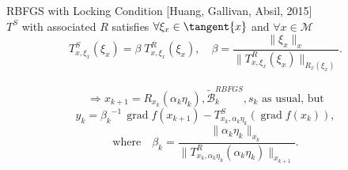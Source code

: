 \documentclass[9.4pt]{beamer}
\begin{document}
\begin{frame}{RBFGS with Locking Condition}
    \vspace{-1\baselineskip}\hfill{\tiny{[Huang, Gallivan, Absil, 2015]}} \\
    $T^S$ with associated $R$ satisfies $\forall \xi_x \in \tangent{x}$ and $\forall x \in \mathcal{M}$
    \begin{equation*}
        T^{S}_{x, \xi_x}(\xi_x) = \beta \; T^{R}_{x, \xi_x}(\xi_x), \quad \beta = \frac{\lVert \xi_x \rVert_x}{\lVert T^{R}_{x, \xi_x}(\xi_x) \rVert_{R_{x}(\xi_x)}}.
    \end{equation*} \\[0.3\baselineskip]
    \begin{equation*}
        \Rightarrow x_{k+1} = R_{x_k}(\alpha_k \eta_k), \widetilde{\mathcal{B}}^{RBFGS}_k, s_k \text{ as usual, but}
    \end{equation*}
    \begin{equation*}
        y_k = {\beta_k}^{-1} \, \operatorname{grad} f(x_{k+1}) - T^{S}_{x_k, \alpha_k \eta_k}(\operatorname{grad} f(x_k)),
    \end{equation*}
    \begin{equation*}
        \text{where} \quad \beta_k = \frac{\lVert \alpha_k \eta_k \rVert_{x_k}}{\lVert T^{R}_{x_k, \alpha_k \eta_k}(\alpha_k \eta_k) \rVert_{x_{k+1}}}.
    \end{equation*}
\end{frame}
\end{document}
